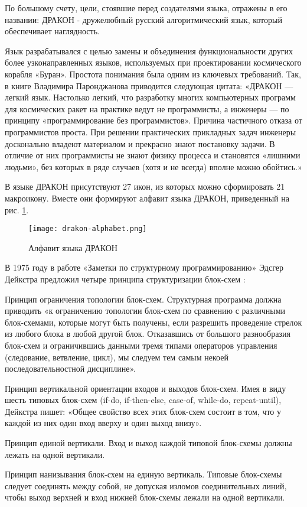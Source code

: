По большому счету, цели, стоявшие перед создателями языка, отражены в его названии: ДРАКОН - дружелюбный русский алгоритмический язык, который обеспечивает наглядность.

Язык разрабатывался с целью замены и объединения функциональности других более узконаправленных языков, используемых при проектировании космического корабля «Буран». Простота понимания была одним из ключевых требований. Так, в книге Владимира Паронджанова приводится следующая цитата: «ДРАКОН — легкий язык. Настолько легкий, что разработку многих компьютерных программ для космических ракет на практике ведут не программисты, а инженеры — по принципу «программирование без программистов». Причина частичного отказа от программистов проста. При решении практических прикладных задач инженеры досконально владеют материалом и прекрасно знают постановку задачи. В отличие от них программисты не знают физику процесса и становятся «лишними людьми», без которых в ряде случаев (хотя и не всегда) вполне можно обойтись.» \cite{drakon}

В языке ДРАКОН присутствуют 27 икон, из которых можно сформировать 21 макроикону. Вместе они формируют алфавит языка ДРАКОН, приведенный на рис. \ref{fig:drakon-alphabet}.

\begin{figure}[htbp]
	\centering
	\texttt{[image: drakon-alphabet.png]}
	\caption{Алфавит языка ДРАКОН}%
	\label{fig:drakon-alphabet}
\end{figure}

В 1975 году в работе «Заметки по структурному программированию» Эдсгер Дейкстра предложил четыре принципа структуризации блок-схем \cite{deixtra}:
\begin{enumerate*}
	\item Принцип ограничения топологии блок-схем. Структурная программа должна приводить «к ограничению топологии блок-схем по сравнению с различными блок-схемами, которые могут быть получены, если разрешить проведение стрелок из любого блока в любой другой блок. Отказавшись от большого разнообразия блок-схем и ограничившись данными тремя типами операторов управления (следование, ветвление, цикл), мы следуем тем самым некоей последовательностной дисциплине».
	\item Принцип вертикальной ориентации входов и выходов блок-схем. Имея в виду шесть типовых блок-схем (if-do, if-then-else, case-of, while-do, repeat-until), Дейкстра пишет: «Общее свойство всех этих блок-схем состоит в том, что у каждой из них один вход вверху и один выход внизу».
	\item Принцип единой вертикали. Вход и выход каждой типовой блок-схемы должны лежать на одной вертикали.
	\item Принцип нанизывания блок-схем на единую вертикаль. Типовые блок-схемы следует соединять между собой, не допуская изломов соединительных линий, чтобы выход верхней и вход нижней блок-схемы лежали на одной вертикали.
\end{enumerate*}

